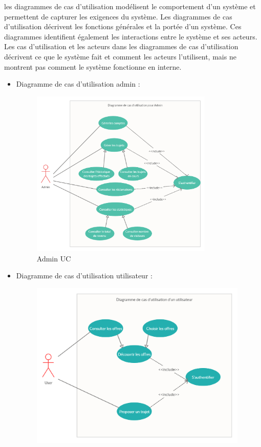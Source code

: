 \documentclass[a4paper]{report}
\begin{document}
\begin{spacing}{2}
les diagrammes de cas d'utilisation modélisent le comportement d'un système et permettent de capturer les exigences du système. Les diagrammes de cas d'utilisation décrivent
les fonctions générales et la portée d'un système. Ces diagrammes identifient également les
interactions entre le système et ses acteurs. Les cas d'utilisation et les acteurs dans les diagrammes de cas d'utilisation décrivent ce que le système fait et comment les acteurs l'utilisent,
mais ne montrent pas comment le système fonctionne en interne.
\cleardoublepage
\begin{itemize}
\item Diagramme de cas d’utilisation admin :
\begin{figure}[!ht]
\begin{center}
\includegraphics[height=8cm]{Projet_JEE/AdminUC.jpg}
\end{center}
\caption[Admin UC]{Admin UC}
\end{figure}
\cleardoublepage
\item Diagramme de cas d’utilisation utilisateur :
\begin{figure}[!ht]
\begin{center}
\includegraphics[height=8cm]{Projet_JEE/UserUC.jpg}

\end{center}
\end{figure}
\end{itemize}
\end{spacing}
\end{document}
